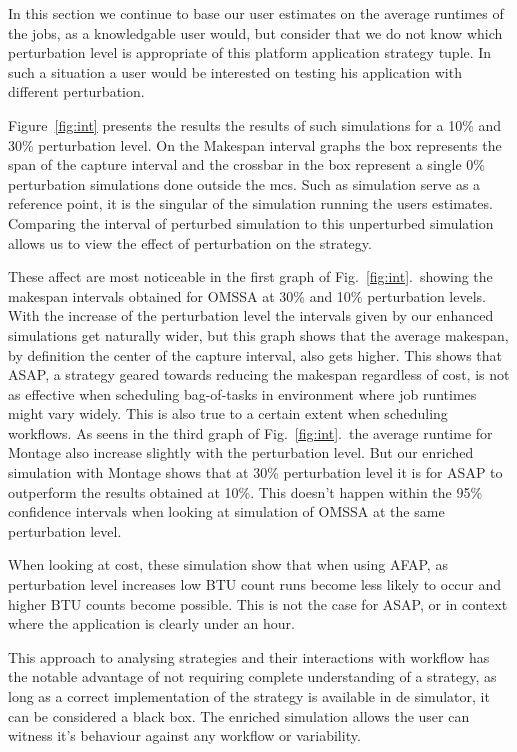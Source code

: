 \documentclass[10pt,conference,compsocconf]{IEEEtran}
\begin{document}
In this section we continue to base our user estimates on the average runtimes
of the jobs, as a knowledgable user would, but consider that we do not know
which perturbation level is appropriate of this platform application strategy
tuple. In such a situation a user would be interested on testing his application
with different perturbation.

Figure~\ref{fig:int} presents the results the results of such simulations for a
10\% and 30\% perturbation level. On the Makespan interval graphs the box
represents the span of the capture interval and the crossbar in the box
represent a single 0\% perturbation simulations done outside the \ac{mcs}. Such
as simulation serve as a reference point, it is the singular of the simulation
running the users estimates. Comparing the interval of perturbed simulation to
this unperturbed simulation allows us to view the effect of perturbation on the
strategy. 

These affect are most noticeable in the first graph of Fig.~\ref{fig:int}.\
showing the makespan intervals obtained for OMSSA at 30\% and 10\% perturbation
levels. With the increase of the perturbation level the intervals given by our
enhanced simulations get naturally wider, but this graph shows that the average
makespan, by definition the center of the capture interval, also gets higher.
This shows that ASAP, a strategy geared towards reducing the makespan regardless
of cost, is not as effective when scheduling bag-of-tasks in environment where
job runtimes might vary widely. This is also true to a certain extent when
scheduling workflows. As seens in the third graph of Fig.~\ref{fig:int}.\ the
average runtime for Montage also increase slightly with the perturbation level.
But our enriched simulation with Montage shows that at 30\% perturbation level
it is for ASAP to outperform the results obtained at 10\%. This doesn't happen
within the 95\% confidence intervals when looking at simulation of OMSSA at the
same perturbation level.

When looking at cost, these simulation show that when using AFAP, as
perturbation level increases low BTU count runs become less likely to occur and
higher BTU counts become possible. This is not the case for ASAP, or in context
where the application is clearly under an hour.

This approach to analysing strategies and their interactions with workflow has
the notable advantage of not requiring complete understanding of a strategy, as
long as a correct implementation of the strategy is available in de simulator,
it can be considered a black box. The enriched simulation allows the user can
witness it's behaviour against any workflow or variability.
\end{document}
